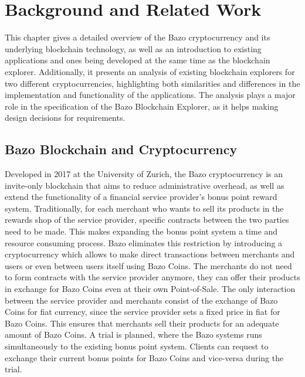 \chapter{Background and Related Work}
This chapter gives a detailed overview of the Bazo cryptocurrency and its underlying blockchain technology, as well as an introduction to existing applications and ones being developed at the same time as the blockchain explorer. Additionally, it presents an analysis of existing blockchain explorers for two different cryptocurrencies, highlighting both similarities and differences in the implementation and functionality of the applications. The analysis plays a major role in the specification of the Bazo Blockchain Explorer, as it helps making design decisions for requirements.

\section{Bazo Blockchain and Cryptocurrency}
Developed in 2017 at the University of Zurich, the Bazo cryptocurrency is an invite-only blockchain that aims to reduce administrative overhead, as well as extend the functionality of a financial service provider's bonus point reward system. Traditionally, for each merchant who wants to sell its products in the rewards shop of the service provider, specific contracts between the two parties need to be made. This makes expanding the bonus point system a time and resource consuming process. Bazo eliminates this restriction by introducing a cryptocurrency which allows to make direct transactions between merchants and users or even between users itself using Bazo Coins. The merchants do not need to form contracts with the service provider anymore, they can offer their products in exchange for Bazo Coins even at their own Point-of-Sale. The only interaction between the service provider and merchants consist of the exchange of Bazo Coins for fiat currency, since the service provider sets a fixed price in fiat for Bazo Coins. This ensures that merchants sell their products for an adequate amount of Bazo Coins. A trial is planned, where the Bazo systems runs simultaneously to the existing bonus point system. Clients can request to exchange their current bonus points for Bazo Coins and vice-versa during the trial. 

